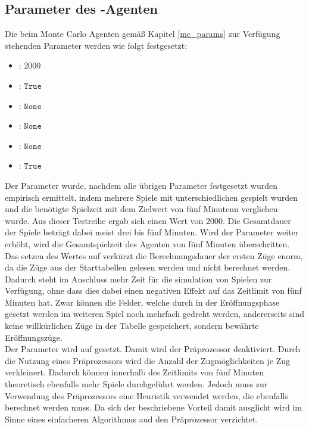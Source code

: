 \subsection{Parameter des -Agenten}
\label{eval:agents:params:subsec-mc}
Die beim Monte Carlo Agenten gemäß Kapitel \ref{mc_params} zur Verfügung stehenden Parameter werden wie folgt festgesetzt:
\begin{itemize}
\item {}: $2000$
\item {}: $\mathtt{True}$
\item {}: $\mathtt{None}$
\item {}: $\mathtt{None}$
\item {}: $\mathtt{None}$
\item {}: $\mathtt{True}$
\end{itemize}
Der Parameter  wurde, nachdem alle übrigen Parameter festgesetzt wurden  empirisch ermittelt, indem mehrere Spiele mit unterschiedlichen  gespielt wurden und die benötigte Spielzeit mit dem Zielwert von fünf Minutenn verglichen wurde. Aus dieser Testreihe ergab sich einen  Wert von $2000$. Die Gesamtdauer der Spiele beträgt dabei meist drei bis fünf Minuten. Wird der Parameter weiter erhöht, wird die Gesamtspielzeit des Agenten von fünf Minuten überschritten.
\\Das setzen des Wertes auf  verkürzt die Berechnungsdauer der ersten Züge enorm, da die Züge aus der Starttabellen gelesen werden und nicht berechnet werden. Dadurch steht im Anschluss mehr Zeit für die simulation von Spielen zur Verfügung, ohne dass dies dabei einen negativen Effekt auf das Zeitlimit von fünf Minuten hat. Zwar können die Felder, welche durch in der Eröffnungsphase gesetzt werden im weiteren Spiel noch mehrfach gedreht werden, andererseits sind keine willkürlichen Züge in der Tabelle gespeichert, sondern bewährte Eröffnungszüge.
\\Der Parameter  wird auf  gesetzt. Damit wird der Präprozessor deaktiviert. Durch die Nutzung eines Präprozessors wird die Anzahl der Zugmöglichkeiten je Zug verkleinert. Dadurch können innerhalb des Zeitlimits von fünf Minuten theoretisch ebenfalls mehr Spiele durchgeführt werden. Jedoch muss zur Verwendung des Präprozessors eine Heuristik verwendet werden, die ebenfalls berechnet werden muss. Da sich der beschriebene Vorteil damit ausglicht wird im Sinne eines einfacheren Algorithmus aud den Präprozessor verzichtet.
